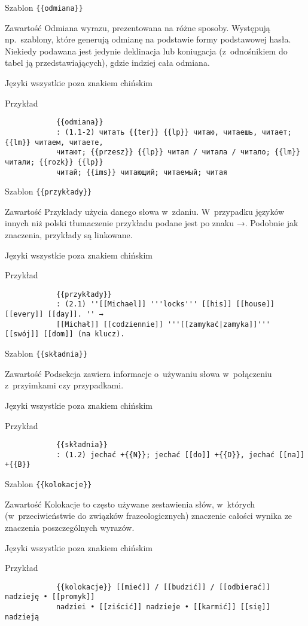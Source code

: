 \spacer
\begin{opis}
	\item[Szablon] \verb|{{odmiana}}|
	\item[Zawartość] Odmiana wyrazu, prezentowana na różne sposoby. Występują np.\ szablony, które generują odmianę na podstawie formy podstawowej hasła. Niekiedy podawana jest jedynie deklinacja lub koniugacja (z~odnośnikiem do tabel ją przedstawiających), gdzie indziej cała odmiana.
	\item[Języki] wszystkie poza znakiem chińskim
	\item[Przykład]
		\begin{verbatim}
			{{odmiana}}
			: (1.1-2) читать {{ter}} {{lp}} читаю, читаешь, читает; {{lm}} читаем, читаете,
			читают; {{przesz}} {{lp}} читал / читала / читало; {{lm}} читали; {{rozk}} {{lp}}
			читай; {{ims}} читающий; читаемый; читая
		\end{verbatim}
\end{opis}
\spacer
\begin{opis}
	\item[Szablon] \verb|{{przykłady}}|
	\item[Zawartość] Przykłady użycia danego słowa w~zdaniu. W~przypadku języków innych niż polski tłumaczenie przykładu podane jest po znaku →. Podobnie jak znaczenia, przykłady są linkowane.
	\item[Języki] wszystkie poza znakiem chińskim
	\item[Przykład]
		\begin{verbatim}
			{{przykłady}}
			: (2.1) ''[[Michael]] '''locks''' [[his]] [[house]] [[every]] [[day]]. '' →
			[[Michał]] [[codziennie]] '''[[zamykać|zamyka]]''' [[swój]] [[dom]] (na klucz).
		\end{verbatim}
\end{opis}
\spacer
\begin{opis}
	\item[Szablon] \verb|{{składnia}}|
	\item[Zawartość] Podsekcja zawiera informacje o~używaniu słowa w~połączeniu z~przyimkami czy przypadkami.
	\item[Języki] wszystkie poza znakiem chińskim
	\item[Przykład]
		\begin{verbatim}
			{{składnia}}
			: (1.2) jechać +{{N}}; jechać [[do]] +{{D}}, jechać [[na]] +{{B}}
		\end{verbatim}
\end{opis}
\spacer
\begin{opis}
	\item[Szablon] \verb|{{kolokacje}}|
	\item[Zawartość] Kolokacje to często używane zestawienia słów, w~których (w~przeciwieństwie do związków frazeologicznych) znaczenie całości wynika ze znaczenia poszczególnych wyrazów.
	\item[Języki] wszystkie poza znakiem chińskim
	\item[Przykład]
		\begin{verbatim}
			{{kolokacje}} [[mieć]] / [[budzić]] / [[odbierać]] nadzieję • [[promyk]]
			nadziei • [[ziścić]] nadzieje • [[karmić]] [[się]] nadzieją
		\end{verbatim}
\end{opis}
